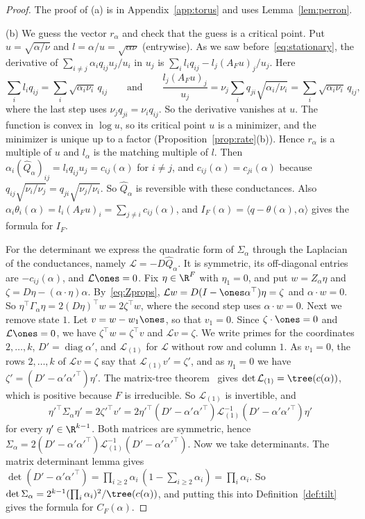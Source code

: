 \begin{proof}
The proof of (a) is in Appendix~\ref{app:torus} and uses Lemma~\ref{lem:perron}.

(b) We guess the vector $r_\alpha$ and check that the guess is a critical point. Put
$u=\sqrt{\alpha/\nu}$ and $l=\alpha/u=\sqrt{\alpha\nu}$ (entrywise). As we saw
before~\eqref{eq:stationary}, the derivative of $\sum_{i\ne j}\alpha_iq_{ij}u_j/u_i$ in $u_j$ is
$\sum_il_iq_{ij}-l_j(A_Fu)_j/u_j$. Here
\[
\sum_il_iq_{ij}=\sum_i\sqrt{\alpha_i\nu_i}\,q_{ij}\qquad\text{and}\qquad
\frac{l_j(A_Fu)_j}{u_j}=\nu_j\sum_iq_{ji}\sqrt{\alpha_i/\nu_i}
=\sum_i\sqrt{\alpha_i\nu_i}\,q_{ij},
\]
where the last step uses $\nu_jq_{ji}=\nu_iq_{ij}$. So the derivative vanishes at $u$. The
function is convex in $\log u$, so its critical point $u$ is a minimizer, and the minimizer is
unique up to a factor (Proposition~\ref{prop:rate}(b)). Hence $r_\alpha$ is a multiple of $u$ and
$l_\alpha$ is the matching multiple of $l$. Then
$\alpha_i(\widehat Q_\alpha)_{ij}=l_iq_{ij}u_j=c_{ij}(\alpha)$ for $i\ne j$, and
$c_{ij}(\alpha)=c_{ji}(\alpha)$ because $q_{ij}\sqrt{\nu_i/\nu_j}=q_{ji}\sqrt{\nu_j/\nu_i}$.
So $\widehat Q_\alpha$ is reversible with these conductances. Also
$\alpha_i\theta_i(\alpha)=l_i(A_Fu)_i=\sum_{j\ne i}c_{ij}(\alpha)$, and
$I_F(\alpha)=\langle q-\theta(\alpha),\alpha\rangle$ gives the formula for $I_F$.

For the determinant we express the quadratic form of $\Sigma_\alpha$ through the Laplacian of the
conductances, namely $\mathcal L=-D\widehat Q_\alpha$. It is symmetric, its off-diagonal entries
are $-c_{ij}(\alpha)$, and $\mathcal L\ones=0$. Fix $\eta\in\R^F$ with $\eta_1=0$, and put
$w=Z_\alpha\eta$ and $\zeta=D\eta-(\alpha\cdot\eta)\alpha$. By~\eqref{eq:Zprops},
$\mathcal Lw=D(I-\ones\alpha^\top)\eta=\zeta$ and $\alpha\cdot w=0$. So
$\eta^\top\Gamma_\alpha\eta=2(D\eta)^\top w=2\zeta^\top w$, where the second step uses
$\alpha\cdot w=0$. Next we remove state $1$. Let $v=w-w_1\ones$,
so that $v_1=0$. Since $\zeta\cdot\ones=0$ and $\mathcal L\ones=0$, we have
$\zeta^\top w=\zeta^\top v$ and $\mathcal Lv=\zeta$. We write primes for the coordinates
$2,\dots,k$, $D'=\operatorname{diag}\alpha'$, and $\mathcal L_{(1)}$ for $\mathcal L$ without row
and column $1$. As $v_1=0$, the rows $2,\dots,k$ of $\mathcal Lv=\zeta$ say that
$\mathcal L_{(1)}v'=\zeta'$, and as $\eta_1=0$ we have $\zeta'=(D'-\alpha'\alpha'^\top)\eta'$. The
matrix-tree theorem~\cite{bollobas1998} gives $\det\mathcal L_{(1)}=\tree(c(\alpha))$, which is
positive because $F$ is irreducible. So $\mathcal L_{(1)}$ is invertible, and
\[
\eta'^\top\Sigma_\alpha\eta'=2\zeta'^\top v'
=2\eta'^\top(D'-\alpha'\alpha'^\top)\mathcal L_{(1)}^{-1}(D'-\alpha'\alpha'^\top)\eta'
\]
for every $\eta'\in\R^{k-1}$. Both matrices are symmetric, hence
$\Sigma_\alpha=2(D'-\alpha'\alpha'^\top)\mathcal L_{(1)}^{-1}(D'-\alpha'\alpha'^\top)$. Now we take
determinants. The matrix determinant lemma gives
$\det(D'-\alpha'\alpha'^\top)=\prod_{i\ge2}\alpha_i\,(1-\sum_{i\ge2}\alpha_i)=\prod_i\alpha_i$.
So $\det\Sigma_\alpha=2^{k-1}(\prod_i\alpha_i)^2/\tree(c(\alpha))$, and putting this into
Definition~\ref{def:tilt} gives the formula for $C_F(\alpha)$.
\end{proof}

